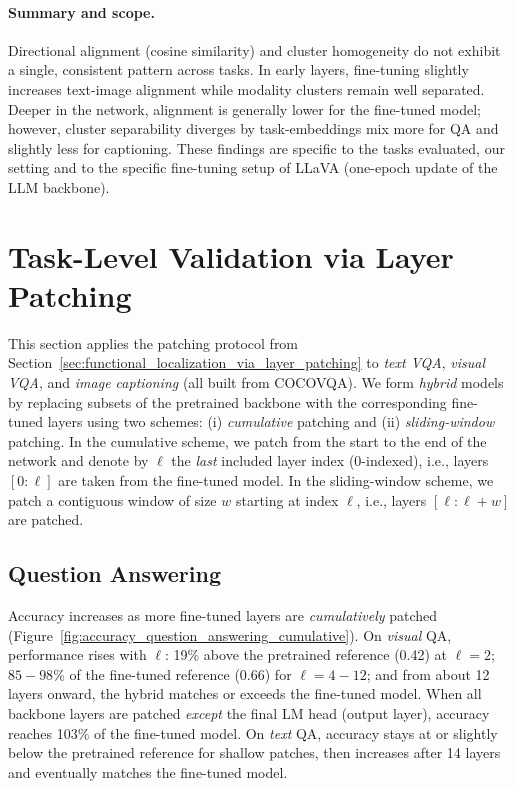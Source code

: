 \paragraph{Summary and scope.}
Directional alignment (cosine similarity) and cluster homogeneity do not exhibit a single, consistent pattern across tasks. In early layers, fine-tuning slightly increases text-image alignment while modality clusters remain well separated. Deeper in the network, alignment is generally lower for the fine-tuned model; however, cluster separability diverges by task-embeddings mix more for QA and slightly less for captioning. These findings are specific to the tasks evaluated, our setting and to the specific fine-tuning setup of LLaVA (one-epoch update of the LLM backbone).

\section{Task-Level Validation via Layer Patching}

This section applies the patching protocol from Section~\ref{sec:functional_localization_via_layer_patching} to \emph{text VQA}, \emph{visual VQA}, and \emph{image captioning} (all built from COCOVQA). We form \emph{hybrid} models by replacing subsets of the pretrained backbone with the corresponding fine-tuned layers using two schemes: (i) \emph{cumulative} patching and (ii) \emph{sliding-window} patching. In the cumulative scheme, we patch from the start to the end of the network and denote by $\ell$ the \emph{last} included layer index (0-indexed), i.e., layers $[0{:}\ell]$ are taken from the fine-tuned model. In the sliding-window scheme, we patch a contiguous window of size $w$ starting at index $\ell$, i.e., layers $[\ell{:}\ell{+}w]$ are patched.

\subsection{Question Answering}

Accuracy increases as more fine-tuned layers are \emph{cumulatively} patched (Figure~\ref{fig:accuracy_question_answering_cumulative}). On \emph{visual} QA, performance rises with $\ell$: 19\% above the pretrained reference (0.42) at $\ell=2$; $85-98$\% of the fine-tuned reference (0.66) for $\ell=4-12$; and from about 12 layers onward, the hybrid matches or exceeds the fine-tuned model. When all backbone layers are patched \emph{except} the final LM head (output layer), accuracy reaches 103\% of the fine-tuned model. On \emph{text} QA, accuracy stays at or slightly below the pretrained reference for shallow patches, then increases after 14 layers and eventually matches the fine-tuned model.

